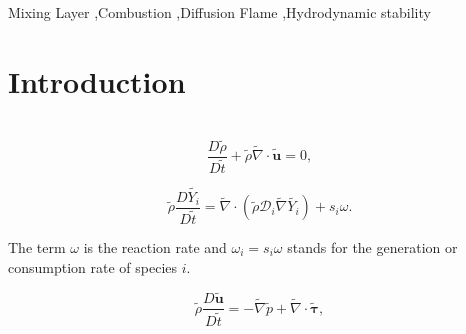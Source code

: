 \documentclass[preprint,12pt,authoryear]{elsarticle}
\begin{document}
\begin{frontmatter}
\begin{keyword}
Mixing Layer  
\sep Combustion 
\sep Diffusion Flame 
\sep Hydrodynamic stability
\end{keyword}

\end{frontmatter}

\linenumbers


\section{Introduction}
%
\
\begin{equation}
 \frac{D \tilde{\rho}}{D \tilde{t}}
+\tilde{\rho} \tilde{\nabla}\cdot\tilde{\mathbf{u}}
 =0,
\label{eq:mass}  
\end{equation}

\begin{equation}
	\tilde{\rho} \frac{D  \tilde{Y_i}}{D \tilde{t}}
= 
	\tilde{\nabla}\cdot( \tilde{\rho} \mathcal{D}_i\tilde{\nabla} \tilde{Y_i})
	+
    s_i \omega.
\label{eq:specie}  
\end{equation}

The term $\omega$ is the reaction rate and 
$\omega_i = s_i \omega$ stands for the generation or consumption rate of species $i$.

\begin{equation}
    \tilde{\rho}\frac{D  \tilde{\mathbf{u}}}{D \tilde{t}}
= - \tilde{\nabla} \tilde{p} 
  + \tilde{\nabla} \cdot \tilde{\pmb{\tau}} 
  ,
\label{eq:momentum}  
\end{equation}
\end{document}

